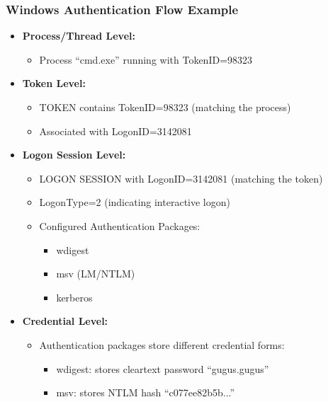 \subsubsection*{Windows Authentication Flow Example}

\begin{itemize}
   \item \textbf{Process/Thread Level:}
   \begin{itemize}
       \item Process ``cmd.exe'' running with TokenID=98323
   \end{itemize}
   
   \item \textbf{Token Level:}
   \begin{itemize}
       \item TOKEN contains TokenID=98323 (matching the process)
       \item Associated with LogonID=3142081
   \end{itemize}
   
   \item \textbf{Logon Session Level:}
   \begin{itemize}
       \item LOGON SESSION with LogonID=3142081 (matching the token)
       \item LogonType=2 (indicating interactive logon)
       \item Configured Authentication Packages:
       \begin{itemize}
           \item wdigest
           \item msv (LM/NTLM)
           \item kerberos
       \end{itemize}
   \end{itemize}
   
   \item \textbf{Credential Level:}
   \begin{itemize}
       \item Authentication packages store different credential forms:
       \begin{itemize}
           \item wdigest: stores cleartext password ``gugus.gugus''
           \item msv: stores NTLM hash ``c077ee82b5b...''
       \end{itemize}
   \end{itemize}
\end{itemize}

